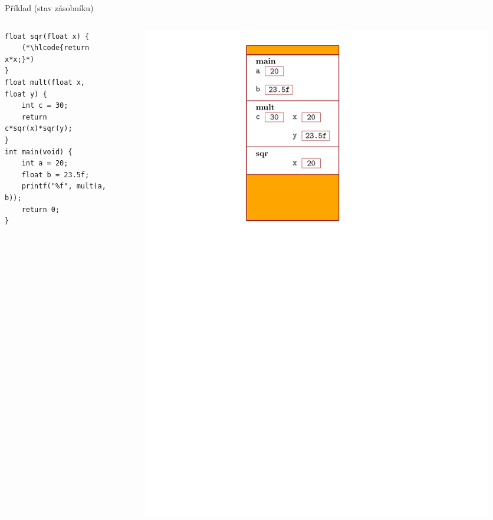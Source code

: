 \documentclass[14pt,aspectratio=169]{beamer}
\begin{document}
    \begin{frame}[t,fragile]{Příklad (stav zásobníku)}
        \begin{columns}[onlytextwidth]
            \begin{column}{0.55\textwidth}
                \begin{lstlisting}
float sqr(float x) {
    (*\hlcode{return x*x;}*)
}
float mult(float x, float y) {
    int c = 30;
    return c*sqr(x)*sqr(y);
}
int main(void) {
    int a = 20;
    float b = 23.5f;
    printf("%f", mult(a, b));
    return 0;
}
                \end{lstlisting}
            \end{column}
            \begin{column}{0.4\textwidth}
                \begin{figure}
                    \centering
                    \includegraphics[scale=.6]{images/zasobnik_stav_7.pdf}
                \end{figure}
            \end{column}
        \end{columns}
    \end{frame}
\end{document}
